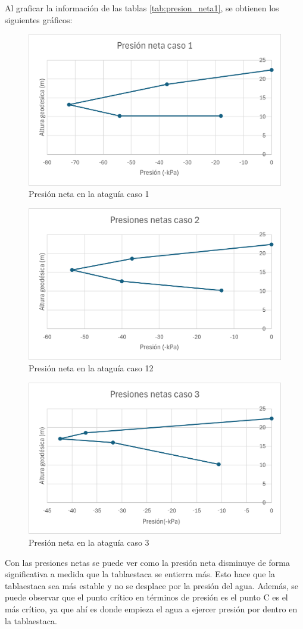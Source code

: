\documentclass{article}
\begin{document}
Al graficar la información de las tablas \ref{tab:presion_neta1}, se obtienen los siguientes gráficos:


\begin{figure}[h!]
  \centering
  \includegraphics[width=0.55\linewidth]{graficos/grafico_presiones_1.png}
  \caption{Presión neta en la ataguía caso 1}
  \label{fig:presion_neta1}
\end{figure}


\begin{figure}[h!]
  \centering
  \includegraphics[width=0.55\linewidth]{graficos/grafico_presiones_2.png}
  \caption{Presión neta en la ataguía caso 12}
  \label{fig:presion_neta2}
\end{figure}

\newpage

\begin{figure}[h!]
  \centering
  \includegraphics[width=0.55\linewidth]{graficos/grafico_presiones_3.png}
  \caption{Presión neta en la ataguía caso 3}
  \label{fig:presion_neta3}
\end{figure}


Con las presiones netas se puede ver como la presión neta disminuye de forma significativa a medida que la tablaestaca se entierra más. Esto hace que la tablaestaca sea más estable y no se desplace por la presión del agua. Además, se puede observar que el punto crítico en términos de presión es el punto C es el más crítico, ya que ahí es donde empieza el agua a ejercer presión por dentro en la tablaestaca.
\end{document}
